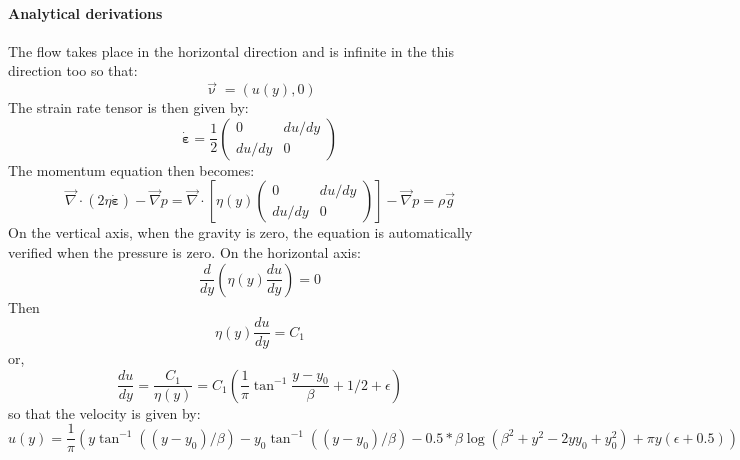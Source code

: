 \paragraph{Analytical derivations} 
The flow takes place in the horizontal direction and is infinite in the this direction too so that:
\[
\vec\upnu=(u(y),0)
\]
The strain rate tensor is then given by:
\[
\dot{\bm \varepsilon}=
\frac{1}{2}
\left(
\begin{array}{cc}
0 & du/dy \\
du/dy & 0
\end{array}
\right)
\]
The momentum equation then becomes:
\[
{\vec \nabla} \cdot (2 \eta \dot{\bm \varepsilon} ) -{\vec \nabla}p 
=
{\vec \nabla} \cdot \left[ \eta(y) 
\left(
\begin{array}{cc}
0 & du/dy \\
du/dy & 0
\end{array}
\right)
\right] -{\vec \nabla}p 
= \rho {\vec g}
\]
On the vertical axis, when the gravity is zero, the equation is automatically verified when the 
pressure is zero.
On the horizontal axis:
\[
\frac{d}{dy} \left(\eta(y) \frac{du}{dy} \right) = 0
\]
Then 
\[
\eta(y) \frac{du}{dy}  = C_1
\]
or,
\[
\frac{du}{dy}  = \frac{C_1}{\eta(y)} = C_1 \left(\frac{1}{\pi} \tan^{-1} \frac{y-y_0}{\beta} 
+ 1/2 + \epsilon\right)
\]
so that the velocity is given by:
\[
u(y) = \frac{1}{\pi} ( y \tan^{-1}((y-y_0)/\beta) - y_0 \tan^{-1}((y-y_0)/\beta)  
-0.5* \beta \log (\beta^2 + y^2 - 2 y y_0 +y_0^2) + \pi y (\epsilon +0.5)) 
\]

